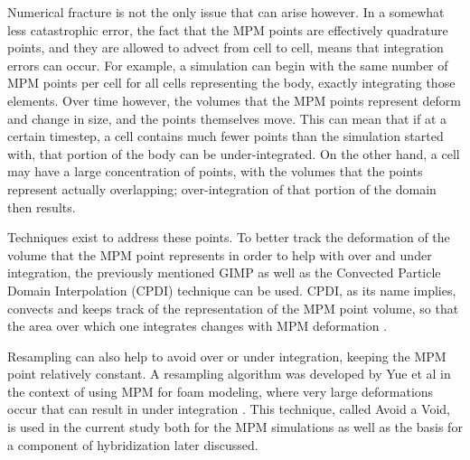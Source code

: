 Numerical fracture is not the only issue that can arise however. In a somewhat less catastrophic error, the fact that the MPM points are effectively quadrature points, and they are allowed to advect from cell to cell, means that integration errors can occur. For example, a simulation can begin with the same number of MPM points per cell for all cells representing the body, exactly integrating those elements. Over time however, the volumes that the MPM points represent deform and change in size, and the points themselves move. This can mean that if at a certain timestep, a cell contains much fewer points than the simulation started with, that portion of the body can be under-integrated. On the other hand, a cell may have a large concentration of points, with the volumes that the points represent actually overlapping; over-integration of that portion of the domain then results.

Techniques exist to address these points. To better track the deformation of the volume that the MPM point represents in order to help with over and under integration, the previously mentioned GIMP as well as the Convected Particle Domain Interpolation (CPDI) technique can be used. CPDI, as its name implies, convects and keeps track of the representation of the MPM point volume, so that the area over which one integrates changes with MPM deformation \cite{Sadeghirad:2011}.

Resampling can also help to avoid over or under integration, keeping the MPM point relatively constant. A resampling algorithm was developed by Yue et al in the context of using MPM for foam modeling, where very large deformations occur that can result in under integration \cite{Yue:2015:Continuum}. This technique, called Avoid a Void, is used in the current study both for the MPM simulations as well as the basis for a component of hybridization later discussed. 